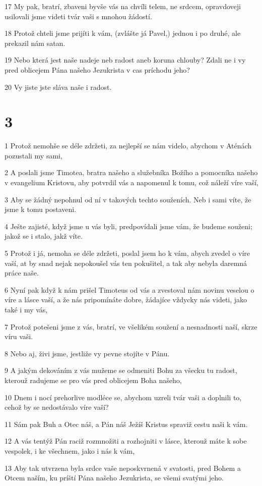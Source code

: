 \par 17 My pak, bratrí, zbaveni byvše vás na chvíli telem, ne srdcem, opravdoveji usilovali jsme videti tvár vaši s mnohou žádostí.
\par 18 Protož chteli jsme prijíti k vám, (zvlášte já Pavel,) jednou i po druhé, ale prekazil nám satan.
\par 19 Nebo která jest naše nadeje neb radost aneb koruna chlouby? Zdali ne i vy pred oblicejem Pána našeho Jezukrista v cas príchodu jeho?
\par 20 Vy jiste jste sláva naše i radost.

\chapter{3}

\par 1 Protož nemohše se déle zdržeti, za nejlepší se nám videlo, abychom v Aténách pozustali my sami,
\par 2 A poslali jsme Timotea, bratra našeho a služebníka Božího a pomocníka našeho v evangelium Kristovu, aby potvrdil vás a napomenul k tomu, což náleží víre vaší,
\par 3 Aby se žádný nepohnul od ní v takových techto souženích. Neb i sami víte, že jsme k tomu postaveni.
\par 4 Ješte zajisté, když jsme u vás byli, predpovídali jsme vám, že budeme souženi; jakož se i stalo, jakž víte.
\par 5 Protož i já, nemoha se déle zdržeti, poslal jsem ho k vám, abych zvedel o víre vaší, at by snad nejak nepokoušel vás ten pokušitel, a tak aby nebyla daremná práce naše.
\par 6 Nyní pak když k nám prišel Timoteus od vás a zvestoval nám novinu veselou o víre a lásce vaší, a že nás pripomínáte dobre, žádajíce vždycky nás videti, jako také i my vás,
\par 7 Protož potešeni jsme z vás, bratrí, ve všelikém soužení a nesnadnosti naší, skrze víru vaši.
\par 8 Nebo aj, živi jsme, jestliže vy pevne stojíte v Pánu.
\par 9 A jakým dekováním z vás mužeme se odmeniti Bohu za všecku tu radost, kterouž radujeme se pro vás pred oblicejem Boha našeho,
\par 10 Dnem i nocí prehorlive modléce se, abychom uzreli tvár vaši a doplnili to, cehož by se nedostávalo víre vaší?
\par 11 Sám pak Buh a Otec náš, a Pán náš Ježíš Kristus spraviž cestu naši k vám.
\par 12 A vás tentýž Pán raciž rozmnožiti a rozhojniti v lásce, kterouž máte k sobe vespolek, i ke všechnem, jako i nás k vám,
\par 13 Aby tak utvrzena byla srdce vaše neposkvrnená v svatosti, pred Bohem a Otcem naším, ku príští Pána našeho Jezukrista, se všemi svatými jeho.

